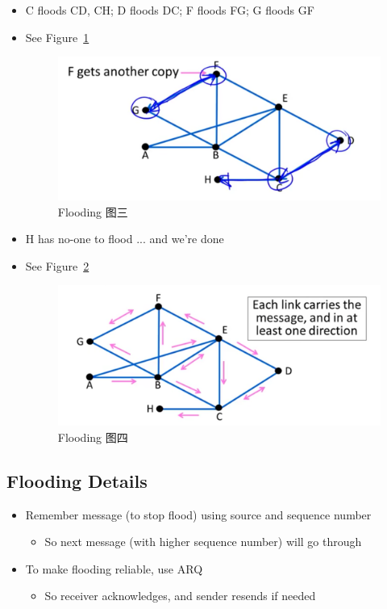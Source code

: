\documentclass[12pt]{ctexart}   %
\begin{document}
\begin{itemize}
		 \item C floods CD, CH; D floods DC; F floods FG; G floods GF
		 \item See Figure~\ref{fig:5-5-4}
			
		\begin{figure}[h!] %
		\centering
		 \includegraphics[scale=0.7]{images/5-5-4}
		\caption{ Flooding 图三 }
		 \label{fig:5-5-4}
		 \end{figure}
		 
		 \item H has no-one to flood ... and we're done
		 \item See Figure~\ref{fig:5-5-5}
			
		\begin{figure}[h!] %
		\centering
		 \includegraphics[scale=0.7]{images/5-5-5}
		\caption{ Flooding 图四 }
		 \label{fig:5-5-5}
		 \end{figure}
		 
	\end{itemize}
	
	\subsection{Flooding Details}
	\begin{itemize}
		\item Remember message (to stop flood) using source and sequence number
		\begin{itemize}
			\item So next message (with higher sequence number) will go through
		\end{itemize}
		
		\item To make flooding reliable, use ARQ
		\begin{itemize}
			\item So receiver acknowledges, and sender resends if needed
		\end{itemize}
	\end{itemize}
	
\end{document}

